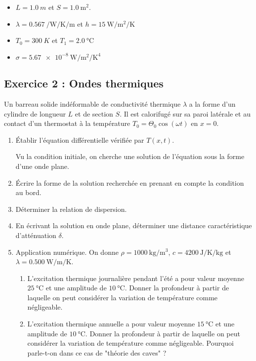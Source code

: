\begin{itemize}
	\item $L = \SI{1.0}{m}$ et $S = \SI{1.0}{\meter\squared}$.
	\item $\lambda = \SI{0.567}{\per\watt\per\kelvin\per\meter}$ et  $h = \SI{15}{\watt\per\meter\squared\per\kelvin}$
	\item $T_0 = \SI{300}{K}$ et $T_1 = \SI{2.0}{\degreeCelsius}$
	\item $\sigma = \SI{5.67e-8}{\watt\per\meter\squared\per\kelvin\tothe{4}}$
\end{itemize}

\subsection{Exercice 2 : Ondes thermiques}

Un barreau solide indéformable de conductivité thermique $\lambda$ a la forme d'un cylindre de longueur $L$ et de section $S$. Il est calorifugé sur sa paroi latérale et au contact d'un thermostat à la température $T_0 = \Theta_0 \cos(\omega t)$ en $x = 0$.

\begin{enumerate}
	\item Établir l'équation différentielle vérifiée par $T(x, t)$.
	
	Vu la condition initiale, on cherche une solution de l'équation sous la forme d'une onde plane. 
	
	\item Écrire la forme de la solution recherchée en prenant en compte la condition au bord.
	\item Déterminer la relation de dispersion.
	\item En écrivant la solution en onde plane, déterminer une distance caractéristique d'atténuation $\delta$.
	\item Application numérique. On donne $\rho = \SI{1000}{\kilogram\per\meter\cubed}$, $c = \SI{4200}{\joule\per\kelvin\per\kilogram}$ et $\lambda = \SI{0.500}{\watt\per\meter\per\kelvin}$.
	\begin{enumerate}
		\item L'excitation thermique journalière pendant l'été a pour valeur moyenne $\SI{25}{\degreeCelsius}$ et une amplitude de $\SI{10}{\degreeCelsius}$. Donner la profondeur à partir de laquelle on peut considérer la variation de température comme négligeable.
		
		\item L'excitation thermique annuelle a pour valeur moyenne $\SI{15}{\degreeCelsius}$ et une amplitude de $\SI{10}{\degreeCelsius}$. Donner la profondeur à partir de laquelle on peut considérer la variation de température comme négligeable. Pourquoi parle-t-on dans ce cas de "théorie des caves" ?
	\end{enumerate}
\end{enumerate}

